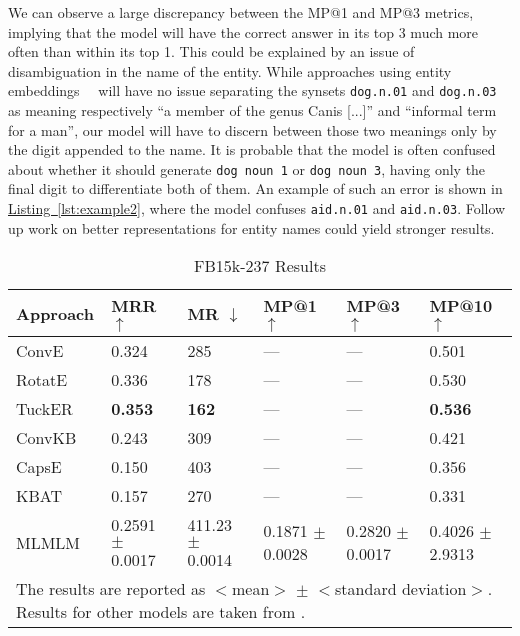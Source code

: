 \documentclass[11pt,a4paper]{article}
\newcommand{\CiteT}[1]{\citet{#1}} \newcommand{\CiteP}[1]{~\citep{#1}} \newcommand{\CodeT}[1]{\texttt{#1}}
\newcommand{\RefListing}[1]{\hyperref[#1]{Listing~\ref{#1}}}
\newcommand{\TableW}[3]{\begin{table*}[h!]
\begin{center}
  \caption{#3} 
  \vspace{-0.25\baselineskip}
  \label{#2}
  #1
\end{center}
\end{table*}}
\begin{document}
We can observe a large discrepancy between the MP@1 and MP@3 metrics, implying that the model will have the correct answer in its top 3 much more often than within its top 1. 
This could be explained by an issue of disambiguation in the name of the entity.
While approaches using entity embeddings~\CiteP{EMB1, EMB2, EMB3} will have no issue separating the synsets \texttt{dog.n.01} and \texttt{dog.n.03} as meaning respectively ``a member of the genus Canis [...]'' and ``informal term for a man'', our model will have to discern between those two meanings only by the digit appended to the name.
It is probable that the model is often confused about whether it should generate \texttt{dog~noun~1} or \texttt{dog~noun~3}, having only the final digit to differentiate both of them.
An example of such an error is shown in \RefListing{lst:example2}, where the model confuses \texttt{aid.n.01} and \texttt{aid.n.03}.
Follow up work on better representations for entity names could yield stronger results.
\TableW{\begin{tabular}{m{}m{}m{0.1\textwidth}m{0.1\textwidth}m{0.1\textwidth}m{0.1\textwidth}}
    \toprule
    Approach & MRR $\uparrow$ & MR $\downarrow$ & MP@1 $\uparrow$ & MP@3 $\uparrow$ & MP@10 $\uparrow$\\
    \midrule
    ConvE & 0.324 & 285 & --- & --- & 0.501\\
    RotatE & 0.336 & 178 & --- & --- & 0.530\\
    TuckER & \textbf{0.353} & \textbf{162} & --- & --- & \textbf{0.536}\\
    \midrule
    ConvKB & 0.243 & 309 & --- & --- & 0.421\\
    CapsE & 0.150 & 403 & --- & --- & 0.356\\
    KBAT & 0.157 & 270 & --- & --- & 0.331\\
    \midrule
    MLMLM & 
        \shortstack[l]{{0.2591}\\{\small$\pm$ 0.0017}} &
        \shortstack[l]{{411.23}\\{\small$\pm$ 0.0014}} &
        \shortstack[l]{{0.1871}\\{\small$\pm$ 0.0028}} &
        \shortstack[l]{{0.2820}\\{\small$\pm$ 0.0017}} &
        \shortstack[l]{{0.4026}\\{\small$\pm$ 2.9313}}\\
    \bottomrule
    \multicolumn{6}{p{.8\textwidth}}{\small The results are reported as $<$mean$>$ $\pm$ $<$standard deviation$>$. Results for other models are taken from \CiteT{ReevaluationKB}.}

  \end{tabular}}
{tab:results_FB15k}
{FB15k-237 Results}
\end{document}
